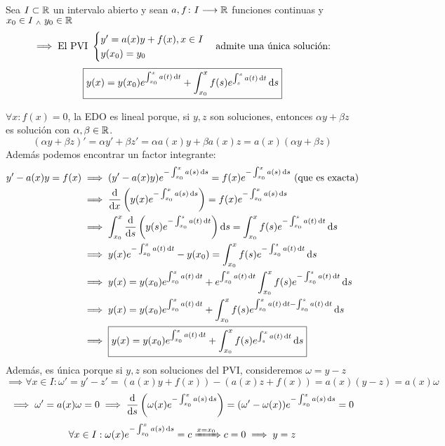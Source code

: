 \begin{teo}[Ejercicio 2.3]
	Sea $I\subset \mathbb{R}$ un intervalo abierto y sean $a, f \colon I \longrightarrow \mathbb{R}$ funciones continuas y $x_0 \in I \; _{\wedge} \; y_0 \in \mathbb{R}$
	\[\implies \text{El PVI } \begin{cases}
			y'=a(x)y + f(x), x\in I \\
			y(x_0) = y_0
		\end{cases} \text{admite una única solución:}\]
	\[\boxed{y(x)=y(x_0)e^{\int_{x_0}^xa(t)\odif{t}}+\int_{x_0}^xf(s)e^{\int_s^xa(t)\odif{t}}\odif{s}}\]
	\begin{dem}
		$\forall x : f(x)=0$, la EDO es lineal porque, si $y, z$ son soluciones, entonces $\alpha y +\beta z$ es solución con $\alpha, \beta \in \mathbb{R}$.
		\[(\alpha y +\beta z)'=\alpha y' + \beta z'= \alpha a(x)y+ \beta a(x)z=a(x)\left(\alpha y + \beta z\right)\]
		Además podemos encontrar un factor integrante:
		\[\begin{aligned}
				y'-a(x)y=f(x) & \implies (y'-a(x)y)e^{-\int_{x_0}^xa(s)\odif{s}}=f(x)e^{-\int_{x_0}^xa(s)\odif{s}} \tex{ (que es exacta)}                                  \\
				              & \implies \odv{}{x}\left(y(x)e^{-\int_{x_0}^xa(s)\odif{s}}\right)=f(x)e^{-\int_{x_0}^xa(s)\odif{s}}                                         \\
				              & \implies \int_{x_0}^x\odv{}{s}\left(y(s)e^{-\int_{x_0}^sa(t)\odif{t}}\right)\odif{s}=\int_{x_0}^xf(s)e^{-\int_{x_0}^sa(t)\odif{t}}\odif{s} \\
				              & \implies y(x)e^{-\int_{x_0}^xa(t)\odif{t}}-y(x_0)=\int_{x_0}^xf(s)e^{-\int_{x_0}^sa(t)\odif{t}}\odif{s}                                    \\
				              & \implies y(x)=y(x_0)e^{\int_{x_0}^xa(t)\odif{t}}+e^{\int_{x_0}^xa(t)\odif{t}}\int_{x_0}^xf(s)e^{-\int_{x_0}^sa(t)\odif{t}}\odif{s}         \\
				              & \implies y(x)=y(x_0)e^{\int_{x_0}^xa(t)\odif{t}}+\int_{x_0}^xf(s)e^{\int_{x_0}^xa(t)\odif{t}-\int_{x_0}^sa(t)\odif{t}}\odif{s}             \\
				              & \implies \boxed{y(x)=y(x_0)e^{\int_{x_0}^xa(t)\odif{t}}+\int_{x_0}^xf(s)e^{\int_s^xa(t)\odif{t}}\odif{s} }
			\end{aligned}\]
		Además, es única porque si $y, z$ son soluciones del PVI, consideremos $\omega = y-z$
		\[\implies \forall x \in I :\omega'=y'-z'=(a(x)y+f(x)) - (a(x)z+f(x))=a(x)(y-z)=a(x)\omega\]
		\[\implies \omega'=a(x)\omega=0 \implies \odv{}{s}\left(\omega(x)e^{-\int_{x_0}^xa(s)\odif{s}}\right)=(\omega' - \omega(x))e^{-\int_{x_0}^xa(s)\odif{s} } = 0\]
		\[\forall x\in I : \omega(x)e^{-\int_{x_0}^xa(s)\odif{s} }=c \xRightarrow{x=x_0} c=0 \implies y=z\]
	\end{dem}
\end{teo}

